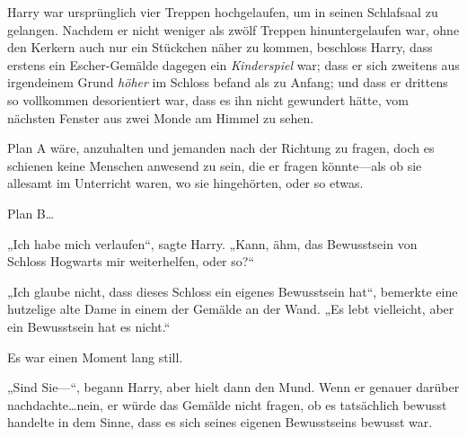 Harry war ursprünglich vier Treppen hochgelaufen, um in seinen Schlafsaal zu gelangen. Nachdem er nicht weniger als zwölf Treppen hinuntergelaufen war, ohne den Kerkern auch nur ein Stückchen näher zu kommen, beschloss Harry, dass erstens ein Escher-Gemälde dagegen ein \emph{Kinderspiel} war; dass er sich zweitens aus irgendeinem Grund \emph{höher} im Schloss befand als zu Anfang; und dass er drittens so vollkommen desorientiert war, dass es ihn nicht gewundert hätte, vom nächsten Fenster aus zwei Monde am Himmel zu sehen.

Plan A wäre, anzuhalten und jemanden nach der Richtung zu fragen, doch es schienen keine Menschen anwesend zu sein, die er fragen könnte—als ob sie allesamt im Unterricht waren, wo sie hingehörten, oder so etwas.

Plan B…

„Ich habe mich verlaufen“, sagte Harry. „Kann, ähm, das Bewusstsein von Schloss Hogwarts mir weiterhelfen, oder so?“

„Ich glaube nicht, dass dieses Schloss ein eigenes Bewusstsein hat“, bemerkte eine hutzelige alte Dame in einem der Gemälde an der Wand. „Es lebt vielleicht, aber ein Bewusstsein hat es nicht.“

Es war einen Moment lang still.

„Sind Sie—“, begann Harry, aber hielt dann den Mund. Wenn er genauer darüber nachdachte…nein, er würde das Gemälde nicht fragen, ob es tatsächlich bewusst handelte in dem Sinne, dass es sich seines eigenen Bewusstseins bewusst war.

